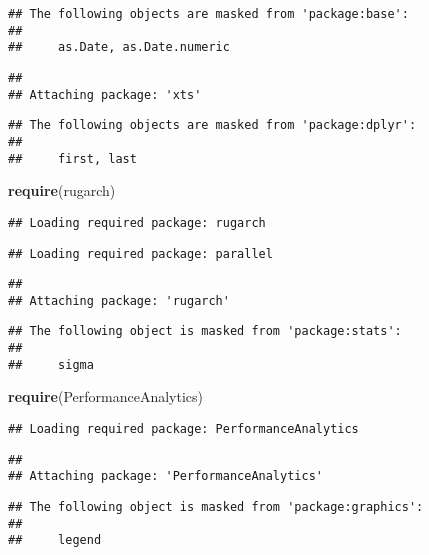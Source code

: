 \documentclass[]{article}
\newenvironment{Shaded}{\begin{snugshade}}{\end{snugshade}}
\newcommand{\KeywordTok}[1]{\textcolor[rgb]{0.13,0.29,0.53}{\textbf{#1}}}
\newcommand{\NormalTok}[1]{#1}
\begin{document}
\begin{verbatim}
## The following objects are masked from 'package:base':
## 
##     as.Date, as.Date.numeric
\end{verbatim}

\begin{verbatim}
## 
## Attaching package: 'xts'
\end{verbatim}

\begin{verbatim}
## The following objects are masked from 'package:dplyr':
## 
##     first, last
\end{verbatim}

\begin{Shaded}
\begin{Highlighting}[]
\KeywordTok{require}\NormalTok{(rugarch)}
\end{Highlighting}
\end{Shaded}

\begin{verbatim}
## Loading required package: rugarch
\end{verbatim}

\begin{verbatim}
## Loading required package: parallel
\end{verbatim}

\begin{verbatim}
## 
## Attaching package: 'rugarch'
\end{verbatim}

\begin{verbatim}
## The following object is masked from 'package:stats':
## 
##     sigma
\end{verbatim}

\begin{Shaded}
\begin{Highlighting}[]
\KeywordTok{require}\NormalTok{(PerformanceAnalytics)}
\end{Highlighting}
\end{Shaded}

\begin{verbatim}
## Loading required package: PerformanceAnalytics
\end{verbatim}

\begin{verbatim}
## 
## Attaching package: 'PerformanceAnalytics'
\end{verbatim}

\begin{verbatim}
## The following object is masked from 'package:graphics':
## 
##     legend
\end{verbatim}
\end{document}
